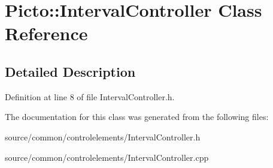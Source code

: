 \hypertarget{class_picto_1_1_interval_controller}{\section{Picto\-:\-:Interval\-Controller Class Reference}
\label{class_picto_1_1_interval_controller}
}


\subsection{Detailed Description}


Definition at line 8 of file Interval\-Controller.\-h.



The documentation for this class was generated from the following files\-:\begin{DoxyCompactItemize}
\item 
source/common/controlelements/Interval\-Controller.\-h\item 
source/common/controlelements/Interval\-Controller.\-cpp\end{DoxyCompactItemize}

